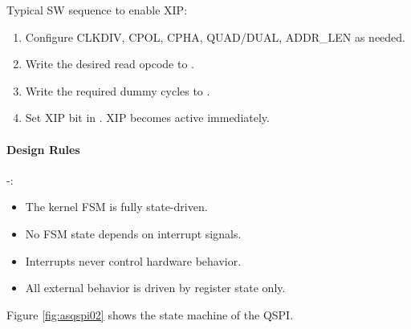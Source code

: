 Typical SW sequence to enable XIP:
\begin{enumerate}
  \item Configure CLKDIV, CPOL, CPHA, QUAD/DUAL, ADDR\_LEN as needed.
  \item Write the desired read opcode to \asqspiCmdRegExt.
  \item Write the required dummy cycles to \asqspiDummyRegExt.
  \item Set XIP bit in \asqspiCtrlRegExt. XIP becomes active immediately.
\end{enumerate}

\paragraph{Design Rules} -:
\begin{itemize}
  \item The kernel FSM is fully state-driven.
  \item No FSM state depends on interrupt signals.
  \item Interrupts never control hardware behavior.
  \item All external behavior is driven by register state only.
\end{itemize}


Figure \ref{fig:asqspi02} shows the state machine of the QSPI.